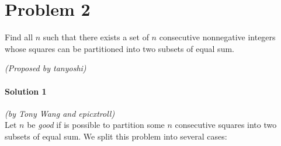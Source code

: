 \documentclass[10pt]{article}
\begin{document}
	\newpage
	
	\section*{Problem 2}
	
	Find all $n$ such that there exists a set of $n$ consecutive nonnegative integers whose squares can be partitioned into two subsets of equal sum.
	\begin{flushright}
	\textit{(Proposed by tanyoshi)}
	\end{flushright}
	
		\noindent \makebox[\linewidth]{\rule{\textwidth}{0.4pt}}	
	
	\paragraph{Solution 1} \textit{(by Tony Wang and epicxtroll)}\\
	
	\noindent Let \(n\) be \emph{good} if is possible to partition some \(n\) consecutive squares into two subsets of equal sum. We split this problem into several cases:
	
\end{document}
